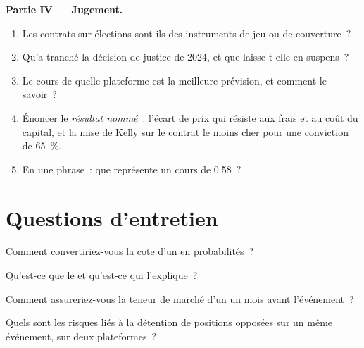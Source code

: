 \begin{problem}
\medskip\noindent\textbf{Partie IV --- Jugement.}
\begin{enumerate}[resume]
\item Les contrats sur élections sont-ils des instruments de jeu ou de couverture~?
\item Qu'a tranché la décision de justice de 2024, et que laisse-t-elle en suspens~?
\item Le cours de quelle plateforme est la meilleure prévision, et comment le savoir~?
\item Énoncer le \emph{résultat nommé}~: l'écart de prix qui résiste aux frais et au coût du capital, et la mise de Kelly sur le contrat le moins cher pour une conviction de 65~\%.
\item En une phrase~: que représente un cours de 0.58~?
\end{enumerate}
\end{problem}

\section{Questions d'entretien}

\begin{interviewq}\label{iq:m3:prediction-and-betting-markets:1}
Comment convertiriez-vous la cote d'un  en probabilités~?
\end{interviewq}

\begin{interviewq}\label{iq:m3:prediction-and-betting-markets:2}
Qu'est-ce que le  et qu'est-ce qui l'explique~?
\end{interviewq}

\begin{interviewq}\label{iq:m3:prediction-and-betting-markets:3}
Comment assureriez-vous la teneur de marché d'un  un mois avant l'événement~?
\end{interviewq}

\begin{interviewq}\label{iq:m3:prediction-and-betting-markets:4}
Quels sont les risques liés à la détention de positions opposées sur un même événement, sur deux plateformes~?
\end{interviewq}

